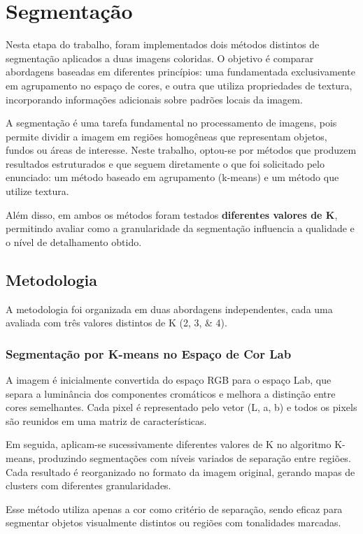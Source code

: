 \documentclass[../main.tex]{subfiles}
\begin{document}
\section{Segmentação}
Nesta etapa do trabalho, foram implementados dois métodos distintos de segmentação aplicados a duas imagens coloridas. O objetivo é comparar abordagens baseadas em diferentes princípios: uma fundamentada exclusivamente em agrupamento no espaço de cores, e outra que utiliza propriedades de textura, incorporando informações adicionais sobre padrões locais da imagem.

A segmentação é uma tarefa fundamental no processamento de imagens, pois permite dividir a imagem em regiões homogêneas que representam objetos, fundos ou áreas de interesse. Neste trabalho, optou-se por métodos que produzem resultados estruturados e que seguem diretamente o que foi solicitado pelo enunciado: um método baseado em agrupamento (k-means) e um método que utilize textura.

Além disso, em ambos os métodos foram testados \textbf{diferentes valores de K}, permitindo avaliar como a granularidade da segmentação influencia a qualidade e o nível de detalhamento obtido.

\subsection{Metodologia}
A metodologia foi organizada em duas abordagens independentes, cada uma avaliada com três valores distintos de K (\numlist{2;3;4}).

\subsubsection{Segmentação por K-means no Espaço de Cor Lab}
A imagem é inicialmente convertida do espaço RGB para o espaço Lab, que separa a luminância dos componentes cromáticos e melhora a distinção entre cores semelhantes. Cada pixel é representado pelo vetor (L, a, b) e todos os pixels são reunidos em uma matriz de características.

Em seguida, aplicam-se sucessivamente diferentes valores de K no algoritmo K-means, produzindo segmentações com níveis variados de separação entre regiões. Cada resultado é reorganizado no formato da imagem original, gerando mapas de clusters com diferentes granularidades.

Esse método utiliza apenas a cor como critério de separação, sendo eficaz para segmentar objetos visualmente distintos ou regiões com tonalidades marcadas.
\end{document}

